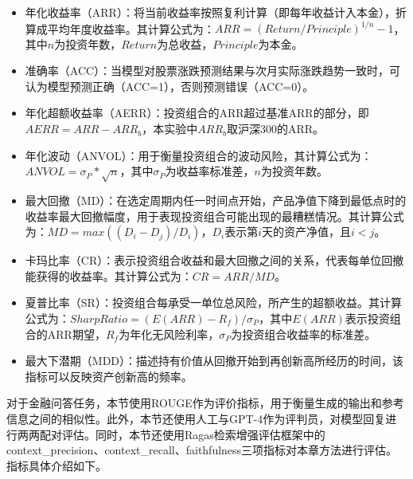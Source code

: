 \begin{itemize}[topsep = 0 pt, itemsep= 0 pt, parsep=0pt, partopsep=0pt, leftmargin=36pt, itemindent=0pt, labelsep=6pt, listparindent=24pt]
	\item 年化收益率（ARR）：将当前收益率按照复利计算（即每年收益计入本金），折算成平均年度收益率。其计算公式为：$ARR = (Return / Principle)^{1/n} - 1$，其中$n$为投资年数，$Return$为总收益，$Principle$为本金。
	\item 准确率（ACC）：当模型对股票涨跌预测结果与次月实际涨跌趋势一致时，可认为模型预测正确（ACC=1），否则预测错误（ACC=0）。
	\item 年化超额收益率（AERR）：投资组合的ARR超过基准ARR的部分，即$AERR = ARR - ARR_{b}$，本实验中$ARR_{b}$取沪深300的ARR。
	\item 年化波动（ANVOL）：用于衡量投资组合的波动风险，其计算公式为：$ANVOL = \sigma_P * \sqrt{n}$，其中$\sigma_P$为收益率标准差，$n$为投资年数。
	\item 最大回撤（MD）：在选定周期内任一时间点开始，产品净值下降到最低点时的收益率最大回撤幅度，用于表现投资组合可能出现的最糟糕情况。其计算公式为：$MD = max((D_i - D_j) / D_i)$，$D_i$表示第$i$天的资产净值，且$i < j$。
	\item 卡玛比率（CR）：表示投资组合收益和最大回撤之间的关系，代表每单位回撤能获得的收益率。其计算公式为：$CR = ARR / MD$。
	\item 夏普比率（SR）：投资组合每承受一单位总风险，所产生的超额收益。其计算公式为：$SharpRatio = (E(ARR) - R_f)/\sigma_P$，其中$E(ARR)$表示投资组合的ARR期望，$R_f$为年化无风险利率，$\sigma_P$为投资组合收益率的标准差。
	\item 最大下潜期（MDD）：描述持有价值从回撤开始到再创新高所经历的时间，该指标可以反映资产创新高的频率。
\end{itemize}

对于金融问答任务，本节使用ROUGE作为评价指标，用于衡量生成的输出和参考信息之间的相似性。此外，本节还使用人工与GPT-4作为评判员，对模型回复进行两两配对评估。同时，本节还使用Ragas\cite{DBLP:conf/eacl/ESJAS24}检索增强评估框架中的context\_precision、context\_recall、faithfulness三项指标对本章方法进行评估。指标具体介绍如下。

